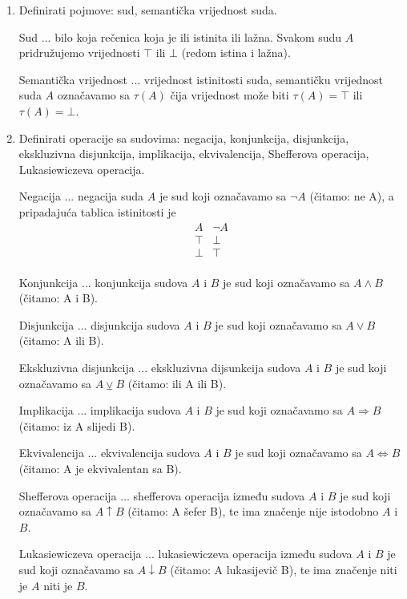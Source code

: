 \documentclass{article}
\begin{document}
\begin{enumerate}
\item Definirati pojmove: sud, semantička vrijednost suda.

Sud ... bilo koja rečenica koja je ili istinita ili lažna. Svakom sudu $A$ pridružujemo vrijednosti $\top$ ili $\bot$ (redom istina i lažna).

Semantička vrijednost ... vrijednost istinitosti suda, semantičku vrijednost suda $A$ označavamo sa $\tau (A)$ čija vrijednost može biti $\tau (A) = \top$ ili $\tau (A) = \bot$.

\item Definirati operacije sa sudovima: negacija, konjunkcija, disjunkcija, ekskluzivna disjunkcija, implikacija, ekvivalencija, Shefferova operacija, Lukasiewiczeva operacija.

Negacija ... negacija suda $A$ je sud koji označavamo sa $\neg A$ (čitamo: ne A), a pripadajuća tablica istinitosti je
\begin{displaymath}
\begin{array}{|c|c|}
A & \neg A\\
\hline
\top & \bot\\
\bot & \top\\
\end{array}
\end{displaymath}

Konjunkcija ... konjunkcija sudova $A$ i $B$ je sud koji označavamo sa $A\land B$ (čitamo: A i B).

Disjunkcija ... disjunkcija sudova $A$ i $B$ je sud koji označavamo sa $A\lor B$ (čitamo: A ili B).

Ekskluzivna disjunkcija ... ekskluzivna dijsunkcija sudova $A$ i $B$ je sud koji označavamo sa $A\veebar B$ (čitamo: ili A ili B).

Implikacija ... implikacija sudova $A$ i $B$ je sud koji označavamo sa $A\Rightarrow B$ (čitamo: iz A slijedi B).

Ekvivalencija ... ekvivalencija sudova $A$ i $B$ je sud koji označavamo sa $A\Leftrightarrow B$ (čitamo: A je ekvivalentan sa B).

Shefferova operacija ... shefferova operacija između sudova $A$ i $B$ je sud koji označavamo sa $A\uparrow B$ (čitamo: A šefer B), te ima značenje nije istodobno $A$ i $B$.

Lukasiewiczeva operacija ... lukasiewiczeva operacija između sudova $A$ i $B$ je sud koji označavamo sa $A\downarrow B$ (čitamo: A lukasijevič B), te ima značenje niti je $A$ niti je $B$.


\end{enumerate}
\end{document}
